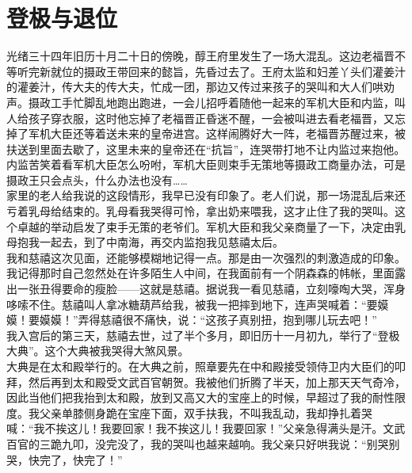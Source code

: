 \fancyhead[RO]{} %
\fancyhead[LE]{} %
\chapter*{登极与退位}
\thispagestyle{empty}
光绪三十四年旧历十月二十日的傍晚，醇王府里发生了一场大混乱。这边老福晋不等听完新就位的摄政王带回来的懿旨，先昏过去了。王府太监和妇差丫头们灌姜汁的灌姜汁，传大夫的传大夫，忙成一团，那边又传过来孩子的哭叫和大人们哄劝声。摄政工手忙脚乱地跑出跑进，一会儿招呼着随他一起来的军机大臣和内监，叫人给孩子穿衣服，这时他忘掉了老福晋正昏迷不醒，一会被叫进去看老福晋，又忘掉了军机大臣还等着送未来的皇帝进宫。这样闹腾好大一阵，老福晋苏醒过来，被扶送到里面去歇了，这里未来的皇帝还在“抗旨”，连哭带打地不让内监过来抱他。内监苦笑着看军机大臣怎么吩咐，军机大臣则束手无策地等摄政工商量办法，可是摄政王只会点头，什么办法也没有……\\

家里的老人给我说的这段情形，我早已没有印象了。老人们说，那一场混乱后来还亏着乳母给结束的。乳母看我哭得可怜，拿出奶来喂我，这才止住了我的哭叫。这个卓越的举动启发了束手无策的老爷们。军机大臣和我父亲商量了一下，决定由乳母抱我一起去，到了中南海，再交内监抱我见慈禧太后。\\

我和慈禧这次见面，还能够模糊地记得一点。那是由一次强烈的刺激造成的印象。我记得那时自己忽然处在许多陌生人中间，在我面前有一个阴森森的帏帐，里面露出一张丑得要命的瘦脸——这就是慈禧。据说我一看见慈禧，立刻嚎啕大哭，浑身哆嗦不住。慈禧叫人拿冰糖葫芦给我，被我一把摔到地下，连声哭喊着：“要嫫嫫！要嫫嫫！”弄得慈禧很不痛快，说：“这孩子真别扭，抱到哪儿玩去吧！”\\

我入宫后的第三天，慈禧去世，过了半个多月，即旧历十一月初九，举行了“登极大典”。这个大典被我哭得大煞风景。\\

大典是在太和殿举行的。在大典之前，照章要先在中和殿接受领侍卫内大臣们的叩拜，然后再到太和殿受文武百官朝贺。我被他们折腾了半天，加上那天天气奇冷，因此当他们把我抬到太和殿，放到又高又大的宝座上的时候，早超过了我的耐性限度。我父亲单膝侧身跪在宝座下面，双手扶我，不叫我乱动，我却挣扎着哭喊：“我不挨这儿！我要回家！我不挨这儿！我要回家！”父亲急得满头是汗。文武百官的三跪九叩，没完没了，我的哭叫也越来越响。我父亲只好哄我说：“别哭别哭，快完了，快完了！”\\


